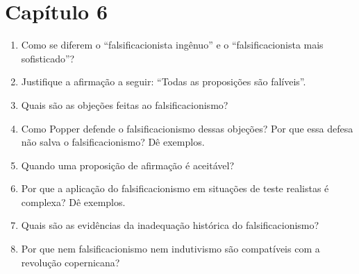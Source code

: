 \documentclass[10pt,a4paper]{extarticle}
\begin{document}
\section*{Capítulo 6}
\begin{enumerate}[resume, label=\textbf{\arabic*.}, itemsep=6pt]
  \item Como se diferem o \enquote{falsificacionista ingênuo} e o \enquote{falsificacionista mais sofisticado}?
  \item Justifique a afirmação a seguir: \enquote{Todas as proposições são falíveis}.
  \item Quais são as objeções feitas ao falsificacionismo?
  \item Como Popper defende o falsificacionismo dessas objeções? Por que essa defesa não salva o falsificacionismo? Dê exemplos.
  \item Quando uma proposição de afirmação é aceitável?
  \item Por que a aplicação do falsificacionismo em situações de teste realistas é complexa? Dê exemplos.
  \item Quais são as evidências da inadequação histórica do falsificacionismo?
  \item Por que nem falsificacionismo nem indutivismo são compatíveis com a revolução copernicana?
\end{enumerate}



\end{document}

